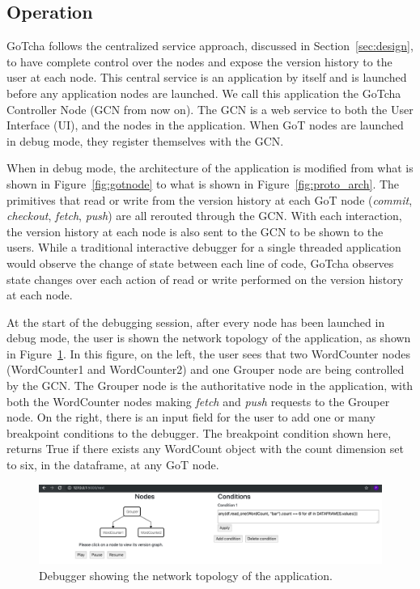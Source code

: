 \subsection{Operation}
GoTcha follows the centralized service approach, discussed in Section~\ref{sec:design}, to have complete control over the nodes and expose the version history to the user at each node. This central service is an application by itself and is launched before any application nodes are launched. We call this application the GoTcha Controller Node (GCN from now on). The GCN is a web service to both the User Interface (UI), and the nodes in the application. When GoT nodes are launched in debug mode, they register themselves with the GCN. 

When in debug mode, the architecture of the application is modified from what is shown in Figure~\ref{fig:gotnode} to what is shown in Figure~\ref{fig:proto_arch}. The primitives that read or write from the version history at each GoT node ({\em commit}, {\em checkout}, {\em fetch}, {\em push}) are all rerouted through the GCN. With each interaction, the version history at each node is also sent to the GCN to be shown to the users. While a traditional interactive debugger for a single threaded application would observe the change of state between each line of code, GoTcha observes state changes over each action of read or write performed on the version history at each node.

At the start of the debugging session, after every node has been launched in debug mode, the user is shown the network topology of the application, as shown in Figure~\ref{fig:start_screen}. In this figure, on the left, the user sees that two WordCounter nodes (WordCounter1 and WordCounter2) and one Grouper node are being controlled by the GCN. The Grouper node is the authoritative node in the application, with both the WordCounter nodes making {\em fetch} and {\em push}  requests to the Grouper node. On the right, there is an input field for the user to add one or many breakpoint conditions to the debugger. The breakpoint condition shown here, returns True if there exists any WordCount object with the count dimension set to six, in the dataframe, at any GoT node.

\begin{figure}
\centering
\includegraphics[width=\textwidth]{images/start_screen.png}
\caption{Debugger showing the network topology of the application.}
\label{fig:start_screen}
\end{figure}

